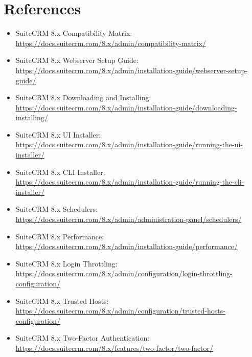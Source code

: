 \documentclass[11pt]{article}
\begin{document}
\section{References}
\begin{itemize}
  \item SuiteCRM 8.x Compatibility Matrix: \url{https://docs.suitecrm.com/8.x/admin/compatibility-matrix/}
  \item SuiteCRM 8.x Webserver Setup Guide: \url{https://docs.suitecrm.com/8.x/admin/installation-guide/webserver-setup-guide/}
  \item SuiteCRM 8.x Downloading and Installing: \url{https://docs.suitecrm.com/8.x/admin/installation-guide/downloading-installing/}
  \item SuiteCRM 8.x UI Installer: \url{https://docs.suitecrm.com/8.x/admin/installation-guide/running-the-ui-installer/}
  \item SuiteCRM 8.x CLI Installer: \url{https://docs.suitecrm.com/8.x/admin/installation-guide/running-the-cli-installer/}
  \item SuiteCRM 8.x Schedulers: \url{https://docs.suitecrm.com/8.x/admin/administration-panel/schedulers/}
  \item SuiteCRM 8.x Performance: \url{https://docs.suitecrm.com/8.x/admin/installation-guide/performance/}
  \item SuiteCRM 8.x Login Throttling: \url{https://docs.suitecrm.com/8.x/admin/configuration/login-throttling-configuration/}
  \item SuiteCRM 8.x Trusted Hosts: \url{https://docs.suitecrm.com/8.x/admin/configuration/trusted-hosts-configuration/}
  \item SuiteCRM 8.x Two-Factor Authentication: \url{https://docs.suitecrm.com/8.x/features/two-factor/two-factor/}
\end{itemize}
\end{document}
